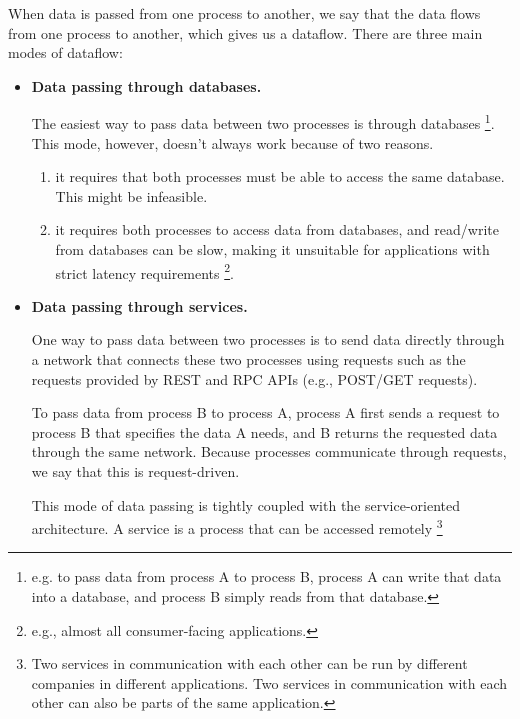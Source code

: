 When data is passed from one process to another, we say that the
data flows from one process to another, which gives us a dataflow.
There are three main modes of dataflow:
\begin{itemize}
    \item \textbf{Data passing through databases.}
    
    \noindent
    The easiest way to pass data between two processes is through
    databases
    \footnote{
        e.g. to pass data from process A to process B, process A
        can write that data into a database, and process B simply
        reads from that database.
    }.
    This mode, however, doesn't always work because of two reasons.
    \begin{enumerate}
        \item it requires that both processes must be able to
        access the same database. This might be infeasible.

        \item it requires both processes to access data from
        databases, and read/write from databases can be slow,
        making it unsuitable for applications with strict latency
        requirements
        \footnote{
            e.g., almost all consumer-facing applications.
        }.
    \end{enumerate}

    
    \item \textbf{Data passing through services.}
    
    \noindent
    One way to pass data between two processes is to send data
    directly through a network that connects these two processes
    using requests such as the requests provided by REST and RPC
    APIs (e.g., POST/GET requests).

    To pass data from process B to process A, process A first sends
    a request to process B that specifies the data A needs, and B
    returns the requested data through the same network. Because
    processes communicate through requests, we say that this is
    request-driven.
    
    This mode of data passing is tightly coupled with the
    service-oriented architecture. A service is a process that
    can be accessed remotely
    \footnote{
        Two services in communication with each other can be run
        by different companies in different applications. Two
        services in communication with each other can also be
        parts of the same application.

}
\end{itemize}
